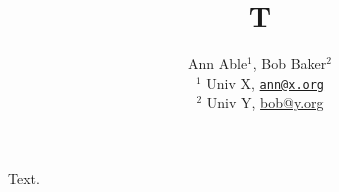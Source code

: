 \documentclass{article}
\begin{document}
\title{T}
\author{Ann Able$^1$, Bob Baker$^2$ \\
$^1$ Univ X, \href{mailto:ann@x.org}{\texttt{ann@x.org}} \\
$^2$ Univ Y, \href{mailto:bob@y.org}{bob@y.org}}
\maketitle
Text.
\end{document}
